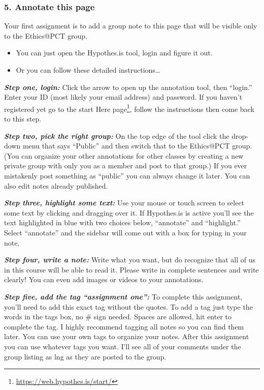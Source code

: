 \documentclass[12pt, openany]{book}
\renewcommand{\href}[2]{#2\footnote{\url{#1}}}
\begin{document}
\hypertarget{annotate-this-page}{%
\subsubsection*{5. Annotate this page}\label{annotate-this-page}}


Your first assignment is to add a group note to this page that will be visible only to the Ethics@PCT group.

\begin{itemize}
\item
  You can just open the Hypothes.is tool, login and figure it out.
\item
  Or you can follow these detailed instructions\ldots{}
\end{itemize}

\textbf{\emph{Step one, login:}} Click the arrow to open up the annotation tool, then ``login.'' Enter your ID (most likely your email address) and password. If you haven't registered yet go to the \href{https://web.hypothes.is/start/}{start Here page}, follow the instructions then come back to this step.

\textbf{\emph{Step two, pick the right group:}} On the top edge of the tool click the drop-down menu that says ``Public'' and then switch that to the Ethics@PCT group. (You can organize your other annotations for other classes by creating a new private group with only you as a member and post to that group.) If you ever mistakenly post something as ``public'' you can always change it later. You can also edit notes already published.

\textbf{\emph{Step three, highlight some text:}} Use your mouse or touch screen to select some text by clicking and dragging over it. If Hypothes.is is active you'll see the text highlighted in blue with two choices below, ``annotate'' and ``highlight.'' Select ``annotate'' and the sidebar will come out with a box for typing in your note.

\textbf{\emph{Step four, write a note:}} Write what you want, but do recognize that all of us in this course will be able to read it. Please write in complete sentences and write clearly! You can even add images or videos to your annotations.

\textbf{\emph{Step five, add the tag ``assignment one'':}} To complete this assignment, you'll need to add this exact tag without the quotes. To add a tag just type the words in the tags box, no \# sign needed. Spaces are allowed, hit enter to complete the tag. I highly recommend tagging all notes so you can find them later. You can use your own tags to organize your notes. After this assignment you can use whatever tags you want. I'll see all of your comments under the group listing as lng as they are posted to the group.
\end{document}

